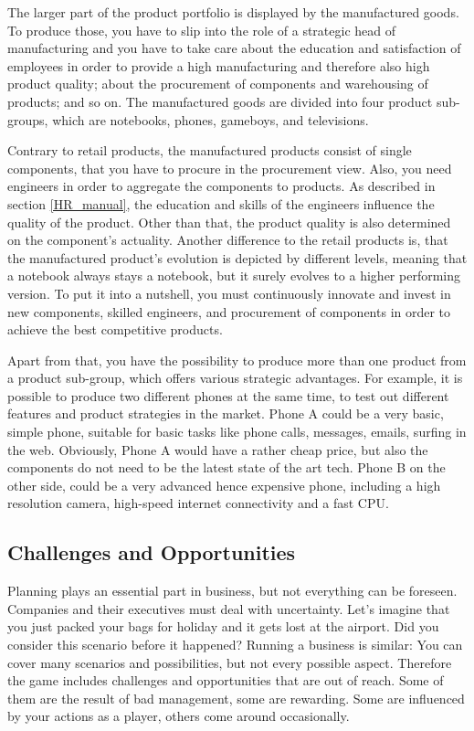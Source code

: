 \documentclass[11pt,titlepage,oneside,openany]{book}
\begin{document}
The larger part of the product portfolio is displayed by the manufactured goods. To produce those, you have to slip into the role of a strategic head of manufacturing and you have to take care about the education and satisfaction of employees in order to provide a high manufacturing and therefore also high product quality; about the procurement of components and warehousing of products; and so on.
The manufactured goods are divided into four product sub-groups, which are notebooks, phones, gameboys, and televisions. 

Contrary to retail products, the manufactured products consist of single components, that you have to procure in the procurement view. Also, you need engineers in order to aggregate the components to products. As described in section \ref{HR_manual}, the education and skills of the engineers influence the quality of the product. Other than that, the product quality is also determined on the component's actuality. Another difference to the retail products is, that the manufactured product's evolution is depicted by different levels, meaning that a notebook always stays a notebook, but it surely evolves to a higher performing version. To put it into a nutshell, you must continuously innovate and invest in new components, skilled engineers, and procurement of components in order to achieve the best competitive products. 

Apart from that, you have the possibility to produce more than one product from a product sub-group, which offers various strategic advantages. For example, it is possible to produce two different phones at the same time, to test out different features and product strategies in the market. Phone A could be a very basic, simple phone, suitable for basic tasks like phone calls, messages, emails, surfing in the web. Obviously, Phone A would have a rather cheap price, but also the components do not need to be the latest state of the art tech. Phone B on the other side, could be a very advanced hence expensive phone, including a high resolution camera, high-speed internet connectivity and a fast CPU.

\subsection{Challenges and Opportunities}

Planning plays an essential part in business, but not everything can be foreseen. Companies and their executives must deal with uncertainty. Let's imagine that you just packed your bags for holiday and it gets lost at the airport. Did you consider this scenario before it happened? Running a business is similar: You can cover many scenarios and possibilities, but not every possible aspect. Therefore the game includes challenges and opportunities that are out of reach. Some of them are the result of bad management, some are rewarding. Some are influenced by your actions as a player, others come around occasionally. 
\end{document}
